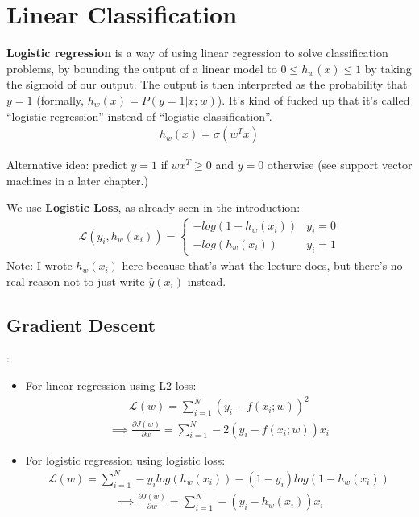 \documentclass{report}
\newcommand{\tbf}{\textbf}
\newcommand{\pd}[2]{\frac{\partial #1}{\partial #2}}
\newcommand*{\newpar}{\par\vspace{\baselineskip}\noindent}
\newcommand{\loss}{\mathcal{L}}
\newcommand{\yhat}{\hat{y}}
\begin{document}
\section{Linear Classification}
\tbf{Logistic regression} is a way of using linear regression to solve classification problems, by bounding the output of a linear model to $0 \leq h_w(x) \leq 1$ by taking the sigmoid of our output. The output is then interpreted as the probability that $y = 1$ (formally, $h_w(x) = P(y = 1|x;w)$). It's kind of fucked up that it's called ``logistic regression'' instead of ``logistic classification''.
\begin{align}
 h_w(x) = \sigma(w^T x)
\end{align}

\newpar
Alternative idea: predict $y = 1$ if $w x^T \geq 0$ and $y = 0$ otherwise (see support vector machines in a later chapter.)
\newpar
We use \tbf{Logistic Loss}, as already seen in the introduction:
\begin{align}
 \loss(y_i,h_w(x_i)) =
 \begin{cases}
    -log(1-h_w(x_i)) & y_i = 0\\
    -log(h_w(x_i)) & y_i = 1
 \end{cases}
\end{align}
Note: I wrote $h_w(x_i)$ here because that's what the lecture does, but there's no real reason not to just write $\yhat(x_i)$ instead.
%
\subsection{Gradient Descent}:
\begin{itemize}
 \item For linear regression using L2 loss:
 \begin{align}
  \loss(w) = \sum_{i=1}^N (y_i - f(x_i; w))^2 
 \end{align}
 \begin{align}
  \implies \pd{J(w)}{w} = \sum_{i=1}^N -2(y_i - f(x_i;w))x_i
 \end{align}
 \item For logistic regression using logistic loss:
 \begin{align}
  \loss(w) = \sum_{i=1}^N -y_i log(h_w(x_i))-(1-y_i)log(1-h_w(x_i))
 \end{align}
 \begin{align}
  \implies \pd{J(w)}{w}  = \sum_{i=1}^N -(y_i - h_w(x_i))x_i
 \end{align}
\end{itemize}
%
\end{document}
